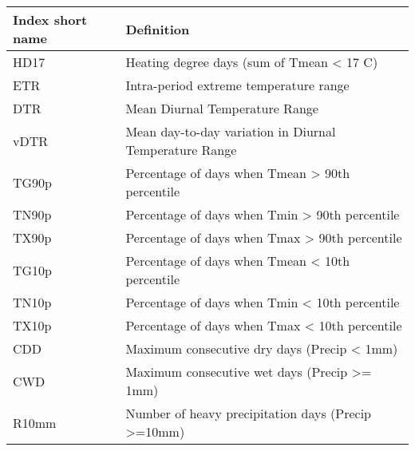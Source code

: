 \documentclass[a4paper,11pt]{article}
\begin{document}
    \begin{table}[h]
    \begin{tabular}{l p{10cm}}
Index short name  &   Definition                                                                                                     \\
\hline
    HD17          &   Heating degree days (sum of Tmean < 17 C)                                                                      \\
    ETR           &   Intra-period extreme temperature range                                                                         \\
    DTR           &   Mean Diurnal Temperature Range                                                                                 \\
    vDTR          &   Mean day-to-day variation in Diurnal Temperature Range                                                         \\
    TG90p         &   Percentage of days when Tmean > 90th percentile                                                                \\
    TN90p         &   Percentage of days when Tmin > 90th percentile                                                                 \\
    TX90p         &   Percentage of days when Tmax > 90th percentile                                                                 \\
    TG10p         &   Percentage of days when Tmean < 10th percentile                                                                \\
    TN10p         &   Percentage of days when Tmin < 10th percentile                                                                 \\
    TX10p         &   Percentage of days when Tmax < 10th percentile                                                                 \\
    CDD           &   Maximum consecutive dry days (Precip < 1mm)                                                                    \\
    CWD           &   Maximum consecutive wet days (Precip >= 1mm)                                                                   \\
    R10mm         &   Number of heavy precipitation days (Precip >=10mm)                                                             \\

\end{tabular}
\end{table}
\end{document}
